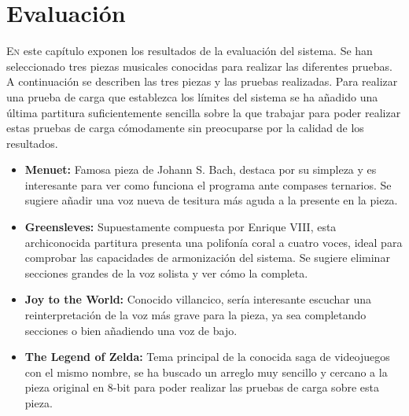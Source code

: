 \chapter{Evaluación}
\label{chap:evaluation}
\vspace{0.5cm}


 \lettrine{E}{n} este capítulo exponen los resultados de la evaluación del sistema. Se han seleccionado tres piezas musicales conocidas para realizar las diferentes pruebas. A continuación se describen las tres piezas y las pruebas realizadas. Para realizar una prueba de carga que establezca los límites del sistema se ha añadido una última partitura suficientemente sencilla sobre la que trabajar para poder realizar estas pruebas de carga cómodamente sin preocuparse por la calidad de los resultados.
 
 \begin{itemize}
 	\item \textbf{Menuet:} Famosa pieza de Johann S. Bach, destaca por su simpleza y es interesante para ver como funciona el programa ante compases ternarios. Se sugiere añadir una voz nueva de tesitura más aguda a la presente en la pieza.
 	\item \textbf{Greensleves:} Supuestamente compuesta por Enrique VIII, esta archiconocida partitura presenta una polifonía coral a cuatro voces, ideal para comprobar las capacidades de armonización del sistema. Se sugiere eliminar secciones grandes de la voz solista y ver cómo la completa.
 	\item \textbf{Joy to the World:} Conocido villancico, sería interesante escuchar una reinterpretación de la voz más grave para la pieza, ya sea completando secciones o bien añadiendo una voz de bajo.
 	\item \textbf{The Legend of Zelda:} Tema principal de la conocida saga de videojuegos con el mismo nombre, se ha buscado un arreglo muy sencillo y cercano a la pieza original en 8-bit para poder realizar las pruebas de carga sobre esta pieza.
 \end{itemize}

